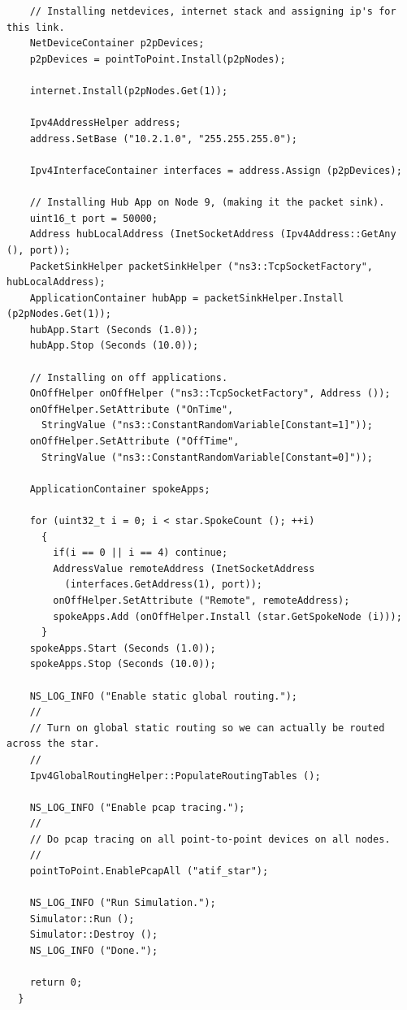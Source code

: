 \documentclass[fullpage]{article}
\begin{document}
\begin{verbatim}
    // Installing netdevices, internet stack and assigning ip's for this link.
    NetDeviceContainer p2pDevices;
    p2pDevices = pointToPoint.Install(p2pNodes);

    internet.Install(p2pNodes.Get(1));

    Ipv4AddressHelper address;
    address.SetBase ("10.2.1.0", "255.255.255.0");

    Ipv4InterfaceContainer interfaces = address.Assign (p2pDevices);

    // Installing Hub App on Node 9, (making it the packet sink).
    uint16_t port = 50000;
    Address hubLocalAddress (InetSocketAddress (Ipv4Address::GetAny (), port));
    PacketSinkHelper packetSinkHelper ("ns3::TcpSocketFactory", hubLocalAddress);
    ApplicationContainer hubApp = packetSinkHelper.Install (p2pNodes.Get(1));
    hubApp.Start (Seconds (1.0));
    hubApp.Stop (Seconds (10.0));

    // Installing on off applications.
    OnOffHelper onOffHelper ("ns3::TcpSocketFactory", Address ());
    onOffHelper.SetAttribute ("OnTime",
      StringValue ("ns3::ConstantRandomVariable[Constant=1]"));
    onOffHelper.SetAttribute ("OffTime",
      StringValue ("ns3::ConstantRandomVariable[Constant=0]"));

    ApplicationContainer spokeApps;

    for (uint32_t i = 0; i < star.SpokeCount (); ++i)
      {
        if(i == 0 || i == 4) continue;
        AddressValue remoteAddress (InetSocketAddress
          (interfaces.GetAddress(1), port));
        onOffHelper.SetAttribute ("Remote", remoteAddress);
        spokeApps.Add (onOffHelper.Install (star.GetSpokeNode (i)));
      }
    spokeApps.Start (Seconds (1.0));
    spokeApps.Stop (Seconds (10.0));

    NS_LOG_INFO ("Enable static global routing.");
    //
    // Turn on global static routing so we can actually be routed across the star.
    //
    Ipv4GlobalRoutingHelper::PopulateRoutingTables ();

    NS_LOG_INFO ("Enable pcap tracing.");
    //
    // Do pcap tracing on all point-to-point devices on all nodes.
    //
    pointToPoint.EnablePcapAll ("atif_star");

    NS_LOG_INFO ("Run Simulation.");
    Simulator::Run ();
    Simulator::Destroy ();
    NS_LOG_INFO ("Done.");

    return 0;
  }
\end{verbatim}
\end{document}
